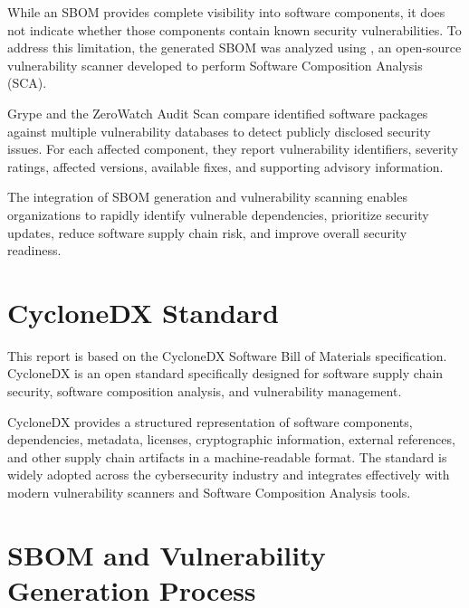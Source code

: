 While an SBOM provides complete visibility into software components, it does not indicate whether those components contain known security vulnerabilities. To address this limitation, the generated SBOM was analyzed using \textbf{\VulScanner}, an open-source vulnerability scanner developed to perform Software Composition Analysis (SCA).

Grype and the ZeroWatch Audit Scan compare identified software packages against multiple vulnerability databases to detect publicly disclosed security issues. For each affected component, they report vulnerability identifiers, severity ratings, affected versions, available fixes, and supporting advisory information.

The integration of SBOM generation and vulnerability scanning enables organizations to rapidly identify vulnerable dependencies, prioritize security updates, reduce software supply chain risk, and improve overall security readiness.

\vspace{0.4cm}

\section{CycloneDX Standard}

This report is based on the CycloneDX Software Bill of Materials specification. CycloneDX is an open standard specifically designed for software supply chain security, software composition analysis, and vulnerability management.

CycloneDX provides a structured representation of software components, dependencies, metadata, licenses, cryptographic information, external references, and other supply chain artifacts in a machine-readable format. The standard is widely adopted across the cybersecurity industry and integrates effectively with modern vulnerability scanners and Software Composition Analysis tools.

\vspace{0.4cm}

\section{SBOM and Vulnerability Generation Process}

